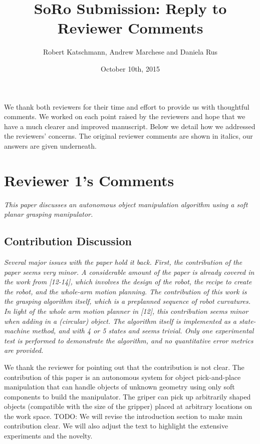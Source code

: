 \documentclass[letterpaper, 10 pt, twocolumn, conference]{article}
\begin{document}
\title{SoRo Submission: Reply to Reviewer Comments}
\author{Robert Katschmann, Andrew Marchese and Daniela Rus}
\date{October 10th, 2015}
\maketitle

We thank both reviewers for their time and effort to provide us with thoughtful comments. We worked on each point raised by the reviewers and hope that we have a much clearer and improved manuscript. Below we detail how we addressed the reviewers’ concerns. The original reviewer comments are shown in italics, our answers are given underneath. 


\section{Reviewer 1's Comments}

\textit{This paper discusses an autonomous object manipulation algorithm using a soft planar grasping manipulator.}

\subsection{Contribution Discussion}
\textit{Several major issues with the paper hold it back. First, the contribution of the paper seems very minor. A considerable amount of the paper is already covered in the work from [12-14], which involves the design of the robot, the recipe to create the robot, and the whole-arm motion planning. The contribution of this work is the grasping algorithm itself, which is a preplanned sequence of robot curvatures. In light of the whole arm motion planner in [12], this contribution seems minor when adding in a (circular) object.  The algorithm itself is implemented as a state-machine method, and with 4 or 5 states and seems trivial. Only one experimental test is performed to demonstrate the algorithm, and no quantitative error metrics are provided.}

We thank the reviewer for pointing out that the contribution is not clear. The contribution of this paper is an autonomous system for object pick-and-place manipulation that can handle objects of unknown geometry using only soft components to build the manipulator. The griper can pick up arbitrarily shaped objects (compatible with the size of the gripper) placed at arbitrary locations on the work space. 
TODO: We will revise the introduction section to make main contribution clear. We will also adjust the text to highlight the extensive experiments and the novelty. 
\end{document}
